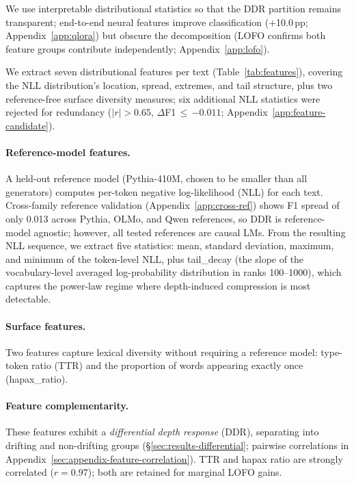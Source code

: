We use interpretable distributional statistics so that the DDR partition remains transparent; end-to-end neural features improve classification ($+$10.0\,pp; Appendix~\ref{app:qlora}) but obscure the decomposition (LOFO confirms both feature groups contribute independently; Appendix~\ref{app:lofo}).

 We extract seven distributional features per text (Table~\ref{tab:features}), covering the NLL distribution's location, spread, extremes, and tail structure, plus two reference-free surface diversity measures; six additional NLL statistics were rejected for redundancy ($|r| > 0.65$, $\Delta$F1\,$\leq$\,$-0.011$; Appendix~\ref{app:feature-candidate}).

\paragraph{Reference-model features.}
 A held-out reference model (Pythia-410M, chosen to be smaller than all generators) computes per-token negative log-likelihood (NLL) for each text.
Cross-family reference validation (Appendix~\ref{app:cross-ref}) shows F1 spread of only 0.013 across Pythia, OLMo, and Qwen references, so DDR is reference-model agnostic; however, all tested references are causal LMs.
From the resulting NLL sequence, we extract five statistics: mean, standard deviation, maximum, and minimum of the token-level NLL, plus tail\_decay (the slope of the vocabulary-level averaged log-probability distribution in ranks 100--1000), which captures the power-law regime where depth-induced compression is most detectable.

\paragraph{Surface features.}
Two features capture lexical diversity without requiring a reference model: type-token ratio (TTR) and the proportion of words appearing exactly once (hapax\_ratio).

\paragraph{Feature complementarity.}
These features exhibit a \emph{differential depth response} (DDR), separating into drifting and non-drifting groups (\S\ref{sec:results-differential}; pairwise correlations in Appendix~\ref{sec:appendix-feature-correlation}).
TTR and hapax ratio are strongly correlated ($r = 0.97$); both are retained for marginal LOFO gains.

